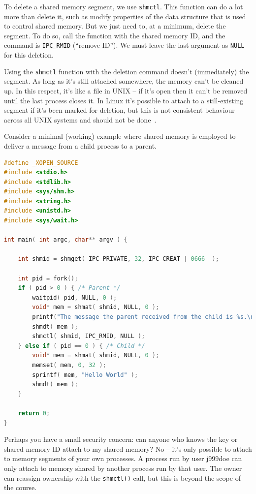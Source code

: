 To delete a shared memory segment, we use \texttt{shmctl}. This function can do a lot more than delete it, such as modify properties of the data structure that is used to control shared memory. But we just need to, at a minimum, delete the segment. To do so, call the function with the shared memory ID, and the command is \texttt{IPC\_RMID} (``remove ID''). We must leave the last argument as \texttt{NULL} for this deletion.

Using the \texttt{shmctl} function with the deletion command doesn't (immediately) the segment. As long as it's still attached somewhere, the memory can't be cleaned up. In this respect, it's like a file in UNIX -- if it's open then it can't be removed until the last process closes it. In Linux it's possible to attach to a still-existing segment if it's been marked for deletion, but this is not consistent behaviour across all UNIX systems and should not be done~\cite{lpi}.


Consider a minimal (working) example where shared memory is employed to deliver a message from a child process to a parent.
\begin{lstlisting}[language=C]
#define _XOPEN_SOURCE
#include <stdio.h>
#include <stdlib.h>
#include <sys/shm.h>
#include <string.h>
#include <unistd.h>
#include <sys/wait.h>

int main( int argc, char** argv ) { 

    int shmid = shmget( IPC_PRIVATE, 32, IPC_CREAT | 0666  );  

    int pid = fork();
    if ( pid > 0 ) { /* Parent */
        waitpid( pid, NULL, 0 );
        void* mem = shmat( shmid, NULL, 0 );
        printf("The message the parent received from the child is %s.\n", (char*) mem );
        shmdt( mem );
        shmctl( shmid, IPC_RMID, NULL );
    } else if ( pid == 0 ) { /* Child */
        void* mem = shmat( shmid, NULL, 0 );
        memset( mem, 0, 32 );
        sprintf( mem, "Hello World" );
        shmdt( mem );
    }   

    return 0;
}
\end{lstlisting}

Perhaps you have a small security concern: can anyone who knows the key or shared memory ID attach to my shared memory? No -- it's only possible to attach to memory segments of your own processes. A process run by user j999doe can only attach to memory shared by another process run by that user. The owner can reassign ownership with the \texttt{shmctl()} call, but this is beyond the scope of the course.


